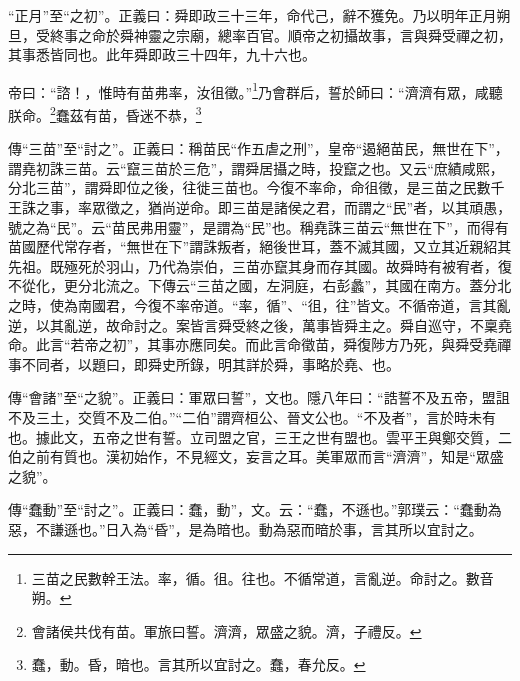 {\noindent\shu{}\fzkt “正月”至“之初”。正義曰：舜即政三十三年，命代己，辭不獲免。乃以明年正月朔旦，受終事之命於舜神靈之宗廟，總率百官。順帝之初攝故事，言與舜受禪之初，其事悉皆同也。此年舜即政三十四年，九十六也。 \par}

帝曰：“諮！，惟時有苗弗率，汝徂徵。”\footnote{三苗之民數幹王法。率，循。徂。往也。不循常道，言亂逆。命討之。數音朔。}乃會群后，誓於師曰：“濟濟有眾，咸聽朕命。\footnote{會諸侯共伐有苗。軍旅曰誓。濟濟，眾盛之貌。濟，子禮反。}蠢茲有苗，昏迷不恭，\footnote{蠢，動。昏，暗也。言其所以宜討之。蠢，春允反。}

{\noindent\zhuan{}\fzbyks 傳“三苗”至“討之”。正義曰：稱苗民“作五虐之刑”，皇帝“遏絕苗民，無世在下”，謂堯初誅三苗。云“竄三苗於三危”，謂舜居攝之時，投竄之也。又云“庶績咸熙，分北三苗”，謂舜即位之後，往徙三苗也。今復不率命，命徂徵，是三苗之民數千王誅之事，率眾徵之，猶尚逆命。即三苗是諸侯之君，而謂之“民”者，以其頑愚，號之為“民”。云“苗民弗用靈”，是謂為“民”也。稱堯誅三苗云“無世在下”，而得有苗國歷代常存者，“無世在下”謂誅叛者，絕後世耳，蓋不滅其國，又立其近親紹其先祖。既殛死於羽山，乃代為崇伯，三苗亦竄其身而存其國。故舜時有被宥者，復不從化，更分北流之。下傳云“三苗之國，左洞庭，右彭蠡”，其國在南方。蓋分北之時，使為南國君，今復不率帝道。“率，循”、“徂，往”皆文。不循帝道，言其亂逆，以其亂逆，故命討之。案皆言舜受終之後，萬事皆舜主之。舜自巡守，不稟堯命。此言“若帝之初”，其事亦應同矣。而此言命徵苗，舜復陟方乃死，與舜受堯禪事不同者，以題曰，即舜史所錄，明其詳於舜，事略於堯、也。 \par}

{\noindent\zhuan{}\fzbyks 傳“會諸”至“之貌”。正義曰：軍眾曰誓”，文也。隱八年曰：“誥誓不及五帝，盟詛不及三土，交質不及二伯。”“二伯”謂齊桓公、晉文公也。“不及者”，言於時未有也。據此文，五帝之世有誓。立司盟之官，三王之世有盟也。雲平王與鄭交質，二伯之前有質也。漢初始作，不見經文，妄言之耳。美軍眾而言“濟濟”，知是“眾盛之貌”。 \par}

{\noindent\zhuan{}\fzbyks 傳“蠢動”至“討之”。正義曰：蠢，動”，文。云：“蠢，不遜也。”郭璞云：“蠢動為惡，不謙遜也。”日入為“昏”，是為暗也。動為惡而暗於事，言其所以宜討之。 \par}

